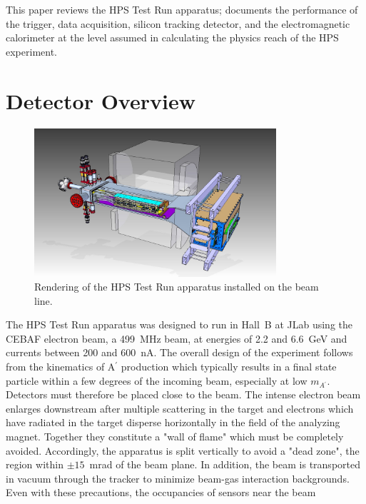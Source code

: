 \documentclass[final,3p,times,twocolumn]{elsarticle}
\newcommand{\Aprime}{A\ensuremath{^\prime}}
\begin{document}
This paper reviews the HPS Test Run apparatus; documents the performance of the trigger, 
data acquisition, silicon tracking detector, and the electromagnetic calorimeter at the level assumed 
in calculating the physics reach of the HPS experiment. 



\section{Detector Overview}
\label{detector}
{\small
\begin{figure}[t]
\begin{center}
    \includegraphics[width=0.8\textwidth]{figures/hps_testrun_rendering}
\caption{Rendering of the HPS Test Run apparatus installed on the beam line.}
\label{fig:testrundetector}
\end{center}
\end{figure}
}
The HPS Test Run apparatus was designed to run in Hall~B at JLab using the CEBAF electron beam, a 
499~MHz beam, at energies of 2.2 and 6.6~GeV and currents between 200 and 600~nA.  
The overall design of the experiment follows from the kinematics of \Aprime{} production which 
typically results in a final state particle within a few degrees of the incoming beam, especially at low 
$m_{\Aprime{}}$. Detectors must therefore be placed close to the beam. 
The intense electron beam enlarges downstream after multiple scattering in the target and electrons 
which have radiated in the target disperse horizontally in the field of the analyzing magnet. Together 
they constitute a "wall of flame" which must be completely avoided. Accordingly, 
the apparatus is split vertically to avoid a "dead zone", the region within $\pm 15$~mrad of the beam 
plane. In addition, the beam is transported in vacuum through the tracker to minimize beam-gas 
interaction backgrounds. Even with these precautions, the occupancies of sensors near the beam 
\end{document}
